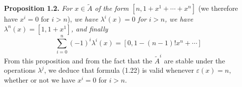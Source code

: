 \textbf{Proposition 1.2.} \emph{For $x\in\widetilde A$ of the form $[n,1+x^1+\cdots+x^n]$} (we therefore have $x^i=0$ for $i>n$), \emph{we have $\lambda^i(x)=0$ for $i>n$, we have $\lambda^n(x)=[1,1+x^1]$, and finally}
\begin{equation}\tag{1.22}
\sum_{i=0}^n(-1)^i\lambda^i(x)=[0,1-(n-1)!x^n+\cdots]
\end{equation}
From this proposition and from the fact that the $\widetilde A^i$ are stable under the operations $\lambda^j$, we deduce that formula (1.22) is valid whenever $\varepsilon(x)=n$, whether or not we have $x^i=0$ for $i>n$.

